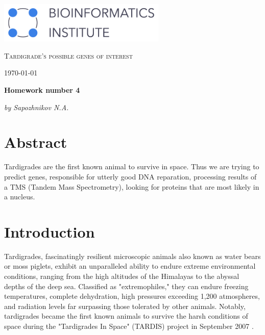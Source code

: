 \documentclass{article}
\begin{document}
\begin{titlepage}
	\centering
	\includegraphics[width=0.6\textwidth]{Graphics/BI_logo.png}\par
	\vspace{5cm}

	{\scshape\huge Tardigrade's possible genes of interest\par} 
	\vspace{1cm}
	{\Large \today\par}
	\vfill
	
	{\huge\bfseries Homework number 4\par}
	\vfill
	
	{\Large\itshape by Sapozhnikov N.A.}\par
	\vspace{1.5cm}

	\vfill


	\vfill
\end{titlepage}

\newpage

\section{Abstract}
Tardigrades are the first known animal to survive in space. Thus we are trying to predict genes, responsible for utterly good DNA reparation, processing results of a TMS (Tandem Mass Spectrometry), looking for proteins that are most likely in a nucleus.

\section{Introduction}
Tardigrades, fascinatingly resilient microscopic animals also known as water bears or moss piglets, exhibit an unparalleled ability to endure extreme environmental conditions, ranging from the high altitudes of the Himalayas to the abyssal depths of the deep sea. Classified as "extremophiles," they can endure freezing temperatures, complete dehydration, high pressures exceeding 1,200 atmospheres, and radiation levels far surpassing those tolerated by other animals. Notably, tardigrades became the first known animals to survive the harsh conditions of space during the "Tardigrades In Space" (TARDIS) project in September 2007 \cite{Erdmann2017-bc}.
\end{document}
